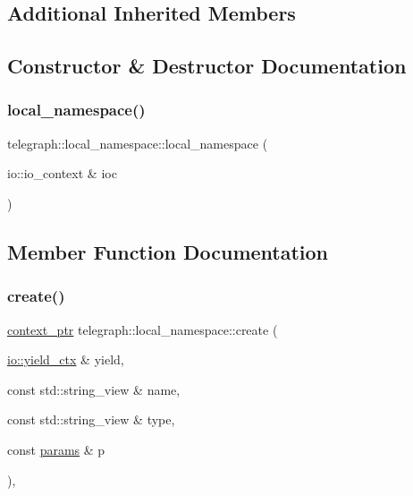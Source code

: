 \subsection*{Additional Inherited Members}


\subsection{Constructor \& Destructor Documentation}
\mbox{\label{classtelegraph_1_1local__namespace_ace7dfdc615015182df5aa9a542833858}} 
\subsubsection{\texorpdfstring{local\+\_\+namespace()}{local\_namespace()}}
{\footnotesize\ttfamily telegraph\+::local\+\_\+namespace\+::local\+\_\+namespace (\begin{DoxyParamCaption}\item[{io\+::io\+\_\+context \&}]{ioc }\end{DoxyParamCaption})}



\subsection{Member Function Documentation}
\mbox{\label{classtelegraph_1_1local__namespace_a5ebe002275408c950d8fd44b829434e4}} 
\subsubsection{\texorpdfstring{create()}{create()}}
{\footnotesize\ttfamily \hyperlink{namespacetelegraph_a332e681f0d44a1308cf3a013a9dd140f}{context\+\_\+ptr} telegraph\+::local\+\_\+namespace\+::create (\begin{DoxyParamCaption}\item[{\hyperlink{structboost_1_1asio_1_1yield__ctx}{io\+::yield\+\_\+ctx} \&}]{yield,  }\item[{const std\+::string\+\_\+view \&}]{name,  }\item[{const std\+::string\+\_\+view \&}]{type,  }\item[{const \hyperlink{classtelegraph_1_1params}{params} \&}]{p }\end{DoxyParamCaption})\hspace{0.3cm}{\ttfamily [override]}, {\ttfamily [virtual]}}



